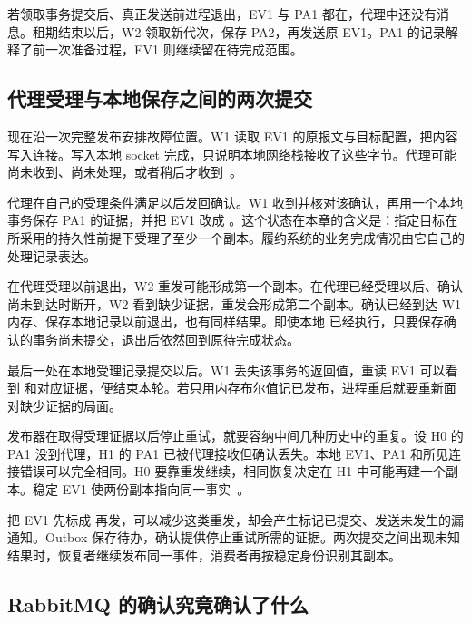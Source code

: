 若领取事务提交后、真正发送前进程退出，EV1 与 PA1 都在，代理中还没有消息。租期结束以后，W2 领取新代次，保存 PA2，再发送原 EV1。PA1 的记录解释了前一次准备过程，EV1 则继续留在待完成范围。

\subsection*{代理受理与本地保存之间的两次提交}

现在沿一次完整发布安排故障位置。W1 读取 EV1 的原报文与目标配置，把内容写入连接。写入本地 socket 完成，只说明本地网络栈接收了这些字节。代理可能尚未收到、尚未处理，或者稍后才收到~\cite{rabbitmq-confirms}。

代理在自己的受理条件满足以后发回确认。W1 收到并核对该确认，再用一个本地事务保存 PA1 的证据，并把 EV1 改成 。这个状态在本章的含义是：指定目标在所采用的持久性前提下受理了至少一个副本。履约系统的业务完成情况由它自己的处理记录表达。


在代理受理以前退出，W2 重发可能形成第一个副本。在代理已经受理以后、确认尚未到达时断开，W2 看到缺少证据，重发会形成第二个副本。确认已经到达 W1 内存、保存本地记录以前退出，也有同样结果。即使本地  已经执行，只要保存确认的事务尚未提交，退出后依然回到原待完成状态。

最后一处在本地受理记录提交以后。W1 丢失该事务的返回值，重读 EV1 可以看到  和对应证据，便结束本轮。若只用内存布尔值记已发布，进程重启就要重新面对缺少证据的局面。

发布器在取得受理证据以后停止重试，就要容纳中间几种历史中的重复。设 H0 的 PA1 没到代理，H1 的 PA1 已被代理接收但确认丢失。本地 EV1、PA1 和所见连接错误可以完全相同。H0 要靠重发继续，相同恢复决定在 H1 中可能再建一个副本。稳定 EV1 使两份副本指向同一事实~\cite{outbox,rabbitmq-reliability}。


把 EV1 先标成  再发，可以减少这类重发，却会产生标记已提交、发送未发生的漏通知。Outbox 保存待办，确认提供停止重试所需的证据。两次提交之间出现未知结果时，恢复者继续发布同一事件，消费者再按稳定身份识别其副本。

\subsection*{RabbitMQ 的确认究竟确认了什么}

